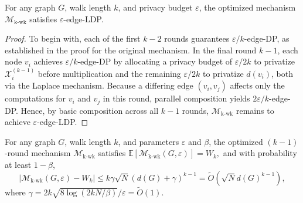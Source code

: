 
\begin{theorem}
For any graph $G$, walk length $k$, and privacy budget $\varepsilon$, the optimized mechanism $\mathcal{M}_{\mathrm{k\text{-}wk}}$ satisfies $\varepsilon$-edge-LDP.
\end{theorem}

\begin{proof}
To begin with, each of the first $k-2$ rounds guarantees $\varepsilon/k$-edge-DP, as established in the proof for the original mechanism. 
In the final round $k-1$, each node $v_i$ achieves $\varepsilon/k$-edge-DP by allocating a privacy budget of $\varepsilon/2k$ to privatize $\mathcal{X}^{(k-1)}_i$ before multiplication and the remaining $\varepsilon/2k$ to privatize $d(v_i)$, both via the Laplace mechanism.  
Because a differing edge $(v_i,v_j)$ affects only the computations for $v_i$ and $v_j$ in this round, parallel composition yields $2\varepsilon/k$-edge-DP. 
Hence, by basic composition across all $k-1$ rounds, $\mathcal{M}_{\mathrm{k\text{-}wk}}$ remains to achieve $\varepsilon$-edge-LDP. \qedhere

\end{proof}




\begin{theorem}
For any graph $G$, walk length $k$, and parameters $\varepsilon$ and $\beta$, the optimized $(k-1)$-round mechanism $\mathcal{M}_{\mathrm{k\text{-}wk}}$ satisfies
$
     \mathbb{E}[\mathcal{M}_{\mathrm{k\text{-}wk}}(G,\varepsilon)] = {W}_k,
$
and with probability at least $1 - \beta$,
\begin{equation*}
|\mathcal{M}_{\mathrm{k\text{-}wk}}(G,\varepsilon) - {W}_k|
  \leq  k\gamma \sqrt{N} (d(G) + \gamma)^{k-1} = \tilde{O}(\sqrt{N}d(G)^{k-1}),
\end{equation*}
where $\gamma = 2k\sqrt{8\log(2kN/\beta)}/\varepsilon = \tilde{O}(1)$.  
\end{theorem}






